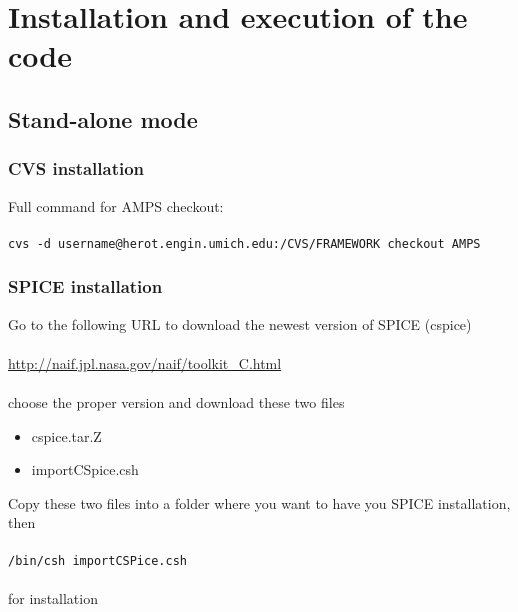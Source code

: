 \chapter{Installation and execution of the code}

\section{Stand-alone mode}

\subsection{CVS installation}
Full command for AMPS checkout:\\\\
{\tt cvs -d username@herot.engin.umich.edu:/CVS/FRAMEWORK checkout AMPS}
\subsection{SPICE installation}
Go to the following URL to download the newest version of SPICE (cspice)\\\\
\url{http://naif.jpl.nasa.gov/naif/toolkit_C.html}\\\\
choose the proper version and download these two files
\begin{itemize}
 \item cspice.tar.Z
 \item importCSpice.csh
\end{itemize}
Copy these two files into a folder where you want to have you SPICE installation, then\\\\
{\tt /bin/csh importCSPice.csh}\\\\
for installation




